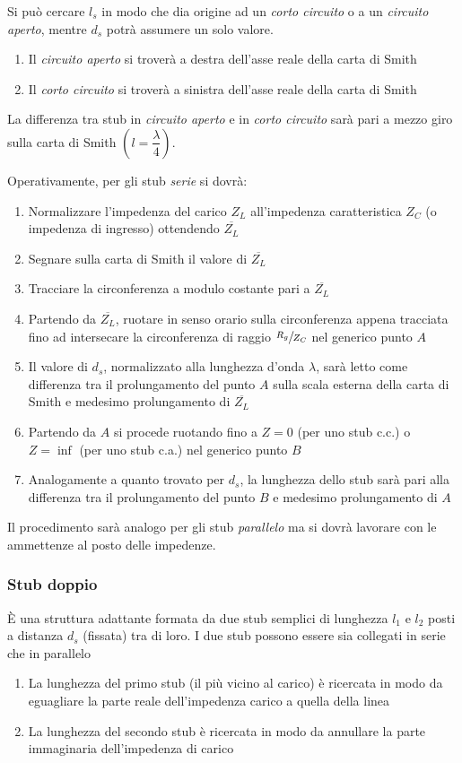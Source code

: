\documentclass{article}
\begin{document}
Si può cercare \(l_s\) in modo che dia origine ad un \textit{corto circuito} o a un \textit{circuito aperto}, mentre \(d_s\) potrà assumere un solo valore.
\begin{enumerate}
	\item Il \textit{circuito aperto} si troverà a destra dell'asse reale della carta di Smith
	\item Il \textit{corto circuito} si troverà a sinistra dell'asse reale della carta di Smith
\end{enumerate}
La differenza tra stub in \textit{circuito aperto} e in \textit{corto circuito} sarà pari a mezzo giro sulla carta di Smith \(( l = \dfrac{\lambda}{4} )\). 

Operativamente, per gli stub \textit{serie} si dovrà:
\begin{enumerate}
	\item Normalizzare l'impedenza del carico \(Z_L\) all'impedenza caratteristica \(Z_C\) (o impedenza di ingresso) ottendendo \(\overline{Z_L}\)
	\item Segnare sulla carta di Smith il valore di \( \overline{Z_L} \)
	\item Tracciare la circonferenza a modulo costante pari a \( \overline{Z_L} \)
	\item Partendo da \(\overline{Z_L}\), ruotare in senso orario sulla circonferenza appena tracciata fino ad intersecare la circonferenza di raggio \(\sfrac{R_g}{Z_C}\) nel generico punto \(A\)
	\item Il valore di \( d_s \), normalizzato alla lunghezza d'onda \( \lambda \), sarà letto come differenza tra il prolungamento del punto \(A\) sulla scala esterna della carta di Smith e medesimo prolungamento di \(\overline{Z_L}\)
	\item Partendo da \(A\) si procede ruotando fino a \(Z = 0\) (per uno stub c.c.) o \( Z = \inf \) (per uno stub c.a.) nel generico punto \(B\)
	\item Analogamente a quanto trovato per \( d_s \), la lunghezza dello stub sarà pari alla differenza tra il prolungamento del punto \(B\) e medesimo prolungamento di \(A\)  
\end{enumerate}
Il procedimento sarà analogo per gli stub \textit{parallelo} ma si dovrà lavorare con le ammettenze al posto delle impedenze.

\subsubsection{Stub doppio}
\`E una struttura adattante formata da due stub semplici di lunghezza \(l_1\) e \(l_2\) posti a distanza \(d_s\) (fissata) tra di loro. I due stub possono essere sia collegati in serie che in parallelo
\begin{enumerate}
	\item La lunghezza del primo stub (il più vicino al carico) è ricercata in modo da eguagliare la parte reale dell'impedenza carico a quella della linea
	\item La lunghezza del secondo stub è ricercata in modo da annullare la parte immaginaria dell'impedenza di carico
\end{enumerate}
\end{document}
